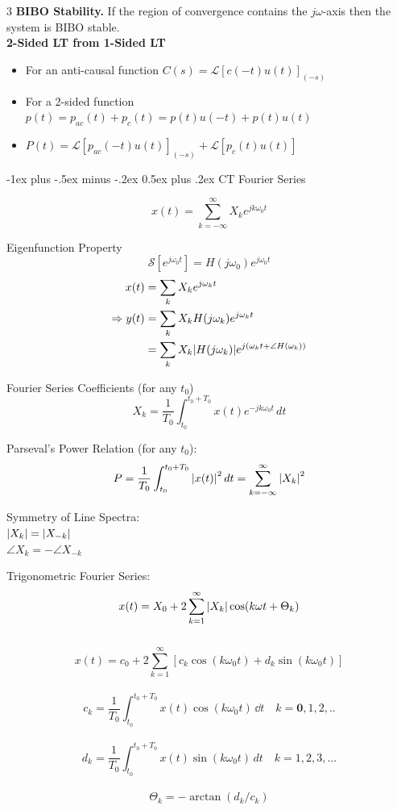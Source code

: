 \documentclass[10pt,landscape]{article}
\makeatletter
\renewcommand{\section}{\@startsection{section}{1}{0mm}%
        {-1ex plus -.5ex minus -.2ex}%
            {0.5ex plus .2ex}%
                {\normalfont\large\bfseries}}
\makeatother
\begin{document}
\begin{multicols}{3}
    \textbf{BIBO Stability. }If the region of convergence contains the $j\omega$-axis then the system is BIBO stable.\\[6pt]
    
    \textbf{2-Sided LT from 1-Sided LT}
    \begin{itemize}
        \item For an anti-causal function $C(s)=\mathcal{L}\left[c(-t)u(t)\right]_{(-s)}$\\
        \item For a 2-sided function $p(t) = p_{ac}(t) + p_c(t) = p(t)u(-t) + p(t)u(t)$\\
        \item 	$P(t)=\mathcal{L}\left[p_{ac}(-t)u(t)\right]_{(-s)} + \mathcal{L}\left[p_{c}(t)u(t)\right]$
    \end{itemize}	
    
    \section{CT Fourier Series}

    \[x(t)=\sum_{k=-\infty}^\infty X_ke^{jk\omega_0 t}\]
    
    Eigenfunction Property
    \[\mathcal{S}[e^{j\omega_0t}] = H(j\omega_0)e^{j\omega_0t}\]
    \begin{align*}
    x(t) &= \sum_k X_k e^{j\omega_kt} \\
    \Rightarrow y(t) &= \sum_k X_k H(j\omega_k)e^{j\omega_kt}\\
    &= \sum_k X_k \abs{H(j\omega_k)}e^{j(\omega_kt + \angle H(\omega_k))}
    \end{align*}
    
    Fourier Series Coefficients (for any $t_0$)
    \[ X_k = \frac{1}{T_0}\int_{t_0}^{t_0 + T_0}x(t)e^{-jk\omega_0t}\,dt\]
    
    Parseval's Power Relation (for any $t_0$):\\
    \[P = \frac{1}{T_0} \int_{t_0}^{t_0 + T_0}\abs{x(t)}^2\,dt = \sum_{k = -\infty}^{\infty}\abs{X_k}^2\]
    
    Symmetry of Line Spectra:\\
     $\abs{X_k} = \abs{X_{-k}}$\\
     $\angle X_k = -\angle X_{-k}$
    
    Trigonometric Fourier Series:\\
    \[x(t) = X_0 + 2\sum_{k = 1}^{\infty}\abs{X_k}\cos(k\omega t + \Theta_k)\]\\
    \[x(t) = c_0 + 2\sum_{k = 1}^{\infty}[c_k\cos(k\omega_0 t) + d_k\sin(k\omega_0 t)]\]\\
    \[c_k = \frac{1}{T_0} \int_{t_0}^{t_0 + T_0}x(t)\cos(k\omega_0 t)\,\dd t \quad k = \textbf{0},1,2,..\]\\
    \[d_k = \frac{1}{T_0} \int_{t_0}^{t_0 + T_0}x(t)\sin(k\omega_0 t)\,dt\quad k = 1,2,3,...\]\\
    \[\Theta_k = -\arctan(d_k/c_k)\]
    

\end{multicols}
\end{document}
